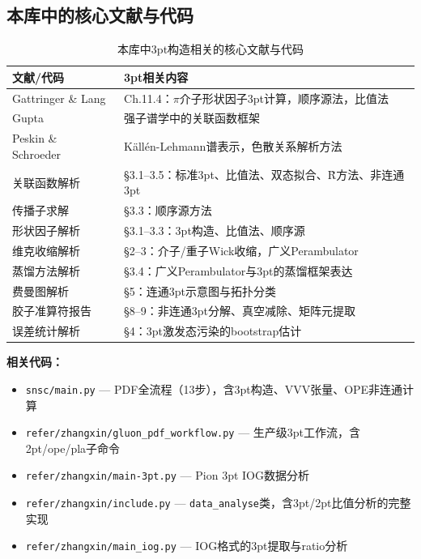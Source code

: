 \documentclass[12pt,a4paper]{ctexart}
\theoremstyle{definition}
\begin{document}
\subsection{本库中的核心文献与代码}

\begin{table}[H]
\centering
\caption{本库中3pt构造相关的核心文献与代码}
\begin{tabular}{ll}
\toprule
\textbf{文献/代码} & \textbf{3pt相关内容} \\
\midrule
Gattringer \& Lang~\cite{GattringerLang2010} & Ch.11.4：$\pi$介子形状因子3pt计算，顺序源法，比值法 \\
Gupta~\cite{GuptaLatticeQCD} & 强子谱学中的关联函数框架 \\
Peskin \& Schroeder~\cite{PeskinSchroeder1995} & K\"all\'en-Lehmann谱表示，色散关系解析方法 \\
关联函数解析~\cite{correlationFunctions2026} & §3.1--3.5：标准3pt、比值法、双态拟合、R̃方法、非连通3pt \\
传播子求解~\cite{propagatorSolvers2026} & §3.3：顺序源方法 \\
形状因子解析~\cite{formFactors2026} & §3.1--3.3：3pt构造、比值法、顺序源 \\
维克收缩解析~\cite{wickContraction2026} & §2--3：介子/重子Wick收缩，广义Perambulator \\
蒸馏方法解析~\cite{distillation2026} & §3.4：广义Perambulator与3pt的蒸馏框架表达 \\
费曼图解析~\cite{feynmanDiagrams2026} & §5：连通3pt示意图与拓扑分类 \\
胶子准算符报告~\cite{gluonQuasiOpReport2026} & §8--9：非连通3pt分解、真空减除、矩阵元提取 \\
误差统计解析~\cite{errorStats2026} & §4：3pt激发态污染的bootstrap估计 \\
\bottomrule
\end{tabular}
\end{table}

\textbf{相关代码：}
\begin{itemize}[leftmargin=*]
    \item \texttt{snsc/main.py} — PDF全流程（13步），含3pt构造、VVV张量、OPE非连通计算~\cite{snscMain2026}
    \item \texttt{refer/zhangxin/gluon\_pdf\_workflow.py} — 生产级3pt工作流，含2pt/ope/pla子命令
    \item \texttt{refer/zhangxin/main-3pt.py} — Pion 3pt IOG数据分析
    \item \texttt{refer/zhangxin/include.py} — \texttt{data\_analyse}类，含3pt/2pt比值分析的完整实现
    \item \texttt{refer/zhangxin/main\_iog.py} — IOG格式的3pt提取与ratio分析
\end{itemize}
\end{document}
